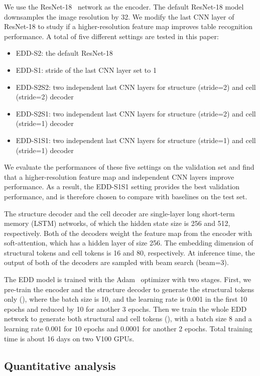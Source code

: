 \documentclass[conference]{IEEEtran}
\begin{document}
We use the ResNet-18~\cite{he2016deep} network as the encoder. The default
ResNet-18 model downsamples the image resolution by 32. We modify the last CNN
layer of ResNet-18 to study if a higher-resolution feature map improves table
recognition performance. A total of five different settings are tested in this
paper:
\begin{itemize}
  \item EDD-S2: the default ResNet-18
  \item EDD-S1: stride of the last CNN layer set to 1
  \item EDD-S2S2: two independent last CNN layers for structure (stride=2) and cell (stride=2) decoder
  \item EDD-S2S1: two independent last CNN layers for structure (stride=2) and cell (stride=1) decoder
  \item EDD-S1S1: two independent last CNN layers for structure (stride=1) and cell (stride=1) decoder
\end{itemize}
We evaluate the performances of these five settings on the validation set and
find that a higher-resolution feature map and independent CNN layers improve
performance. As a result, the EDD-S1S1 setting provides the best validation
performance, and is therefore chosen to compare with baselines on the test set.

The structure decoder and the cell decoder are single-layer long short-term
memory (LSTM) networks, of which the hidden state size is 256 and 512,
respectively. Both of the decoders weight the feature map from the encoder with
soft-attention, which has a hidden layer of size 256. The embedding dimension of
structural tokens and cell tokens is 16 and 80, respectively. At inference time,
the output of both of the decoders are sampled with beam search (beam=3).

The EDD model is trained with the Adam~\cite{kingma2014adam} optimizer with two
stages. First, we pre-train the encoder and the structure decoder to generate
the structural tokens only (), where the batch size is 10, and the
learning rate is 0.001 in the first 10 epochs and reduced by 10 for another 3
epochs. Then we train the whole EDD network to generate both structural and cell
tokens (), with a batch size 8 and a learning rate 0.001 for 10
epochs and 0.0001 for another 2 epochs. Total training time is about 16 days on
two V100 GPUs.

\subsection{Quantitative analysis}
\end{document}
